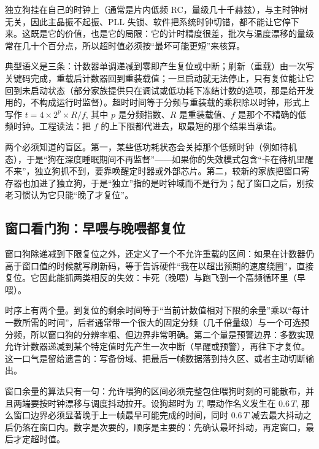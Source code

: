 \documentclass[12pt,a4paper,fontset=fandol]{ctexbook}
\begin{document}
独立狗挂在自己的时钟上（通常是片内低频 RC，量级几十千赫兹），与主时钟树无关，因此主晶振不起振、PLL 失锁、软件把系统时钟切错，都不能让它停下来。这既是它的价值，也是它的局限：它的计时精度很差，批次与温度漂移的量级常在几十个百分点，所以超时值必须按``最坏可能更短''来核算。

典型语义是三条：计数器单调递减到零即产生复位或中断；刷新（重载）由一次写关键码完成，重载后计数器回到重装载值；一旦启动就无法停止，只有复位能让它回到未启动状态（部分家族提供只在调试或低功耗下冻结计数的选项，那是给开发用的，不构成运行时监督）。超时时间等于分频与重装载的乘积除以时钟，形式上写作 $t = 4 \times 2^{p} \times R / f$, 其中 $p$ 是分频指数、$R$ 是重装载值、$f$ 是那个不精确的低频时钟。工程读法：把 $f$ 的上下限都代进去，取最短的那个结果当承诺。

两个必须知道的盲区。第一，某些低功耗状态会关掉那个低频时钟（例如待机态），于是``狗在深度睡眠期间不再监督''——如果你的失效模式包含``卡在待机里醒不来''，独立狗抓不到，要靠唤醒定时器或外部芯片。第二，较新的家族把窗口寄存器也加进了独立狗，于是``独立''指的是时钟域而不是行为；配了窗口之后，别按老习惯认为它只能``晚了才复位''。

\subsection{窗口看门狗：早喂与晚喂都复位}

窗口狗除递减到下限复位之外，还定义了一个不允许重载的区间：如果在计数器仍高于窗口值的时候就写刷新码，等于告诉硬件``我在以超出预期的速度绕圈''，直接复位。它因此能抓两类相反的失效：卡死（晚喂）与跑飞到一个高频循环里（早喂）。

时序上有两个量。到复位的剩余时间等于``当前计数值相对下限的余量''乘以``每计一数所需的时间''，后者通常带一个很大的固定分频（几千倍量级）与一个可选预分频，所以窗口狗的分辨率粗、但边界非常明确。第二个量是预警边界：多数实现允许计数器递减到某个特定值时先产生一次中断（早醒或预警），再往下才复位。这一口气是留给遗言的：写备份域、把最后一帧数据落到持久区、或者主动切断输出。

窗口余量的算法只有一句：允许喂狗的区间必须完整包住喂狗时刻的可能散布，并且两端要按时钟漂移与调度抖动拉开。设狗超时为 $T$, 喂动作名义发生在 $0.6\,T$, 那么窗口边界必须显著晚于上一帧最早可能完成的时间，同时 $0.6\,T$ 减去最大抖动之后仍落在窗口内。数字是次要的，顺序是主要的：先确认最坏抖动，再定窗口，最后才定超时值。
\end{document}
